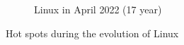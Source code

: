 \begin{figure}[h!]
\begin{subfigure}{0.48\textwidth}
        \caption{Linux in April 2022 (17 year)} 
        \label{fig:Linux_V7_S6}
    \end{subfigure}
    
    \caption{Hot spots during the evolution of Linux} 
    \label{fig:Linux_V7}
\end{figure}
